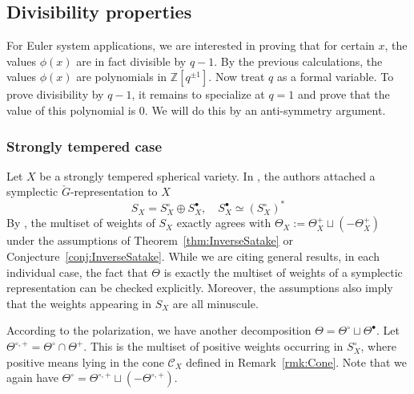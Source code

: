 \documentclass{amsart}
\theoremstyle{definition}
\theoremstyle{remark}
\newcommand{\1}{\mathbf{1}}
\newcommand{\sh}[1]{\mathcal{#1}}
\newcommand{\Z}{\mathbb{Z}}
\theoremstyle{definition}
\begin{document}
\subsection{Divisibility properties}
For Euler system applications, we are interested in proving that for certain $x$, the values $\phi(x)$ are in fact divisible by $q-1$. By the previous calculations, the values $\phi(x)$ are polynomials in $\Z[q^{\pm 1}]$. Now treat $q$ as a formal variable. To prove divisibility by $q-1$, it remains to specialize at $q=1$ and prove that the value of this polynomial is 0. We will do this by an anti-symmetry argument.

\subsubsection{Strongly tempered case}
Let $X$ be a strongly tempered spherical variety. In \cite[\S 4.3, 4.4]{BZSV}, the authors attached a symplectic $\check{G}$-representation to $X$
\[
  S_X=S_X^\circ\oplus S_X^\bullet,\quad S_X^\bullet\simeq(S_X^\circ)^\ast
\]
By \cite[Proposition 9.3.3]{BZSV}, the multiset of weights of $S_X$ exactly agrees with $\Theta_X:=\Theta_X^+\sqcup(-\Theta_X^+)$ under the assumptions of Theorem~\ref{thm:InverseSatake} or Conjecture~\ref{conj:InverseSatake}. While we are citing general results, in each individual case, the fact that $\Theta$ is exactly the multiset of weights of a symplectic representation can be checked explicitly. Moreover, the assumptions also imply that the weights appearing in $S_X$ are all minuscule.

According to the polarization, we have another decomposition $\Theta=\Theta^\circ\sqcup\Theta^\bullet$. Let $\Theta^{\circ,+}=\Theta^\circ\cap\Theta^+$. This is the multiset of positive weights occurring in $S_X^\circ$, where positive means lying in the cone $\sh{C}_X$ defined in Remark~\ref{rmk:Cone}. Note that we again have $\Theta^\circ=\Theta^{\circ,+}\sqcup(-\Theta^{\circ,+})$.
\end{document}

